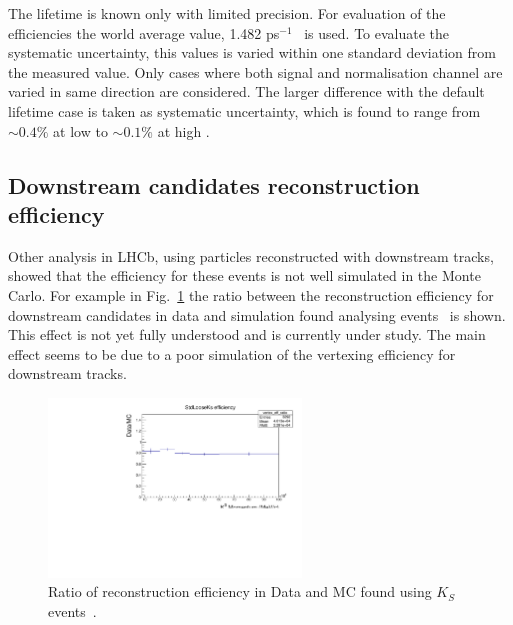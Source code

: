 The \Lb lifetime is known only with limited precision. For evaluation of the efficiencies the
world average value, 1.482 ps$^{-1}$~\cite{Aaij:2013oha} is used. To evaluate the systematic uncertainty,
this values is varied within one standard deviation from the measured value.
Only cases where both signal and normalisation channel are varied in same direction are considered.
The larger difference with the default lifetime case is taken as systematic uncertainty,
which is found to range from $\sim 0.4\%$ at low \qsq to $\sim 0.1\%$ at high \qsq.

\subsection{Downstream candidates reconstruction efficiency}


Other analysis in LHCb, using particles reconstructed with downstream tracks, showed that
the efficiency for these events is not well simulated in the Monte Carlo.
For example in Fig.~\ref{KS_vtxeff} the ratio between the reconstruction efficiency for downstream candidates
in data and simulation found analysing \KS events~\cite{Blake:1631348} is shown. This effect is not
yet fully understood and is currently under study. The main effect seems to be due to a poor simulation
of the vertexing efficiency for downstream tracks.

\begin{figure}
\centering
\includegraphics[width=0.6\textwidth]{Lmumu/figs/DDvtx_eff_POwen.pdf}
\caption{Ratio of reconstruction efficiency in Data and MC found using $K_S$ events~\cite{Blake:1631348}.}
\label{KS_vtxeff}
\end{figure}

